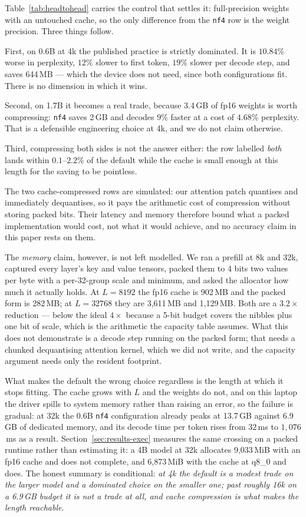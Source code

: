 \documentclass[5p]{elsarticle}
\begin{document}
Table~\ref{tab:headtohead} carries the control that settles it: full-precision
weights with an untouched cache, so the only difference from the \texttt{nf4} row
is the weight precision. Three things follow.

First, on 0.6B at 4k the published practice is strictly dominated. It is $10.84\%$
worse in perplexity, $12\%$ slower to first token, $19\%$ slower per decode step,
and saves 644\,MB --- which the device does not need, since both configurations
fit. There is no dimension in which it wins.

Second, on 1.7B it becomes a real trade, because 3.4\,GB of fp16 weights is worth
compressing: \texttt{nf4} saves 2\,GB and decodes $9\%$ faster at a cost of
$4.68\%$ perplexity. That is a defensible engineering choice at 4k, and we do not
claim otherwise.

Third, compressing both sides is not the answer either: the row labelled
\emph{both} lands within $0.1$--$2.2\%$ of the default while the cache is small
enough at this length for the saving to be pointless.

The two cache-compressed rows are simulated: our attention patch quantises and
immediately dequantises, so it pays the arithmetic cost of compression without
storing packed bits. Their latency and memory therefore bound what a packed
implementation would cost, not what it would achieve, and no accuracy claim in
this paper rests on them.

The \emph{memory} claim, however, is not left modelled. We ran a prefill at 8k and
32k, captured every layer's key and value tensors, packed them to 4 bits two
values per byte with a per-32-group scale and minimum, and asked the allocator how
much it actually holds. At $L{=}8192$ the fp16 cache is 902\,MB and the packed form
is 282\,MB; at $L{=}32768$ they are 3{,}611\,MB and 1{,}129\,MB. Both are a
$3.2\times$ reduction --- below the ideal $4\times$ because a 5-bit budget covers
the nibbles plus one bit of scale, which is the arithmetic the capacity table
assumes. What this does not demonstrate is a decode step running on the packed
form; that needs a chunked dequantising attention kernel, which we did not write,
and the capacity argument needs only the resident footprint.

What makes the default the wrong choice regardless is the length at which it stops
fitting. The cache grows with $L$ and the weights do not, and on this laptop the
driver spills to system memory rather than raising an error, so the failure is
gradual: at 32k the 0.6B \texttt{nf4} configuration already peaks at 13.7\,GB
against 6.9\,GB of dedicated memory, and its decode time per token rises from
$32$\,ms to $1{,}076$\,ms as a result. Section~\ref{sec:results-exec} measures the
same crossing on a packed runtime rather than estimating it: a 4B model at 32k
allocates 9{,}033\,MiB with an fp16 cache and does not complete, and 6{,}873\,MiB
with the cache at q8\_0 and does. The honest summary is
conditional: \emph{at 4k the default is a modest trade on the larger model and a
dominated choice on the smaller one; past roughly 16k on a 6.9\,GB budget it is
not a trade at all, and cache compression is what makes the length reachable}.
\end{document}
